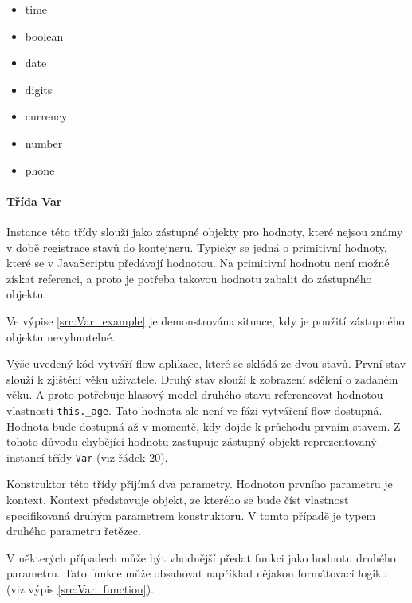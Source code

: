 \documentclass[ing,male,java,dept460,twoside]{diploma}						%
\begin{document}
\begin{itemize}
\item time
\item boolean
\item date
\item digits
\item currency
\item number
\item phone
\end{itemize}

\paragraph{Třída Var}
\label{sec:Var}
Instance této třídy slouží jako zástupné objekty pro hodnoty, které nejsou známy v době registrace stavů do kontejneru. Typicky se jedná o primitivní hodnoty, které se v JavaScriptu předávají hodnotou. Na primitivní hodnotu není možné získat referenci, a proto je potřeba takovou hodnotu zabalit do zástupného objektu.

Ve výpise \ref{src:Var_example} je demonstrována situace, kdy je použití zástupného objektu nevyhnutelné.



Výše uvedený kód vytváří flow aplikace, které se skládá ze dvou stavů. První stav slouží k zjištění věku uživatele. Druhý stav slouží k zobrazení sdělení o zadaném věku. A proto potřebuje hlasový model druhého stavu referencovat hodnotou vlastnosti \mbox{\texttt{this.\_age}}. Tato hodnota ale není ve fázi vytváření flow dostupná. Hodnota bude dostupná až v momentě, kdy dojde k průchodu prvním stavem. Z tohoto důvodu chybějící hodnotu zastupuje zástupný objekt reprezentovaný instancí třídy \texttt{Var} (viz řádek 20).

Konstruktor této třídy přijímá dva parametry. Hodnotou prvního parametru je kontext. Kontext představuje objekt, ze kterého se bude číst vlastnost specifikovaná druhým parametrem konstruktoru. V tomto případě je typem druhého parametru řetězec.

V některých případech může být vhodnější předat funkci jako hodnotu druhého parametru. Tato funkce může obsahovat například nějakou formátovací logiku (viz výpis \ref{src:Var_function}).


\end{document}
